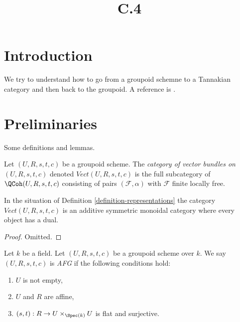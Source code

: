 

%


\title{C.4}


\maketitle

\label{section-phantom}


\tableofcontents


\section{Introduction}
\label{section-introduction}

\noindent
We try to understand how to go from a groupoid schemne to a
Tannakian category and then back to the groupoid.
A reference is \cite{Deligne-tannakian}.



\section{Preliminaries}
\label{section-preliminaries}

\noindent
Some definitions and lemmas.

\begin{definition}
\label{definition-representations}
Let $(U, R, s, t, c)$ be a groupoid scheme. The
{\it category of vector bundles on $(U, R, s, t, c)$} denoted
$\textit{Vect}(U, R, s, t, c)$ is the full subcategory of
$\QCoh(U, R, s, t, c)$ consisting of pairs $(\mathcal{F}, \alpha)$
with $\mathcal{F}$ finite locally free.
\end{definition}

\begin{lemma}
\label{lemma-vector-bundles-on-groupoid}
In the situation of Definition \ref{definition-representations}
the category $\textit{Vect}(U, R, s, t, c)$ is an additive symmetric
monoidal category where every object has a dual.
\end{lemma}

\begin{proof}
Omitted.
\end{proof}

\begin{definition}
\label{definition-affine-fpqc-gerbe}
Let $k$ be a field. Let $(U, R, s, t, c)$ be a groupoid scheme over $k$.
We say $(U, R, s, t, c)$ is {\it AFG} if the following conditions hold:
\begin{enumerate}
\item $U$ is not empty,
\item $U$ and $R$ are affine,
\item $(s, t) : R \to U \times_{\Spec(k)} U$ is flat and surjective.
\end{enumerate}
\end{definition}


